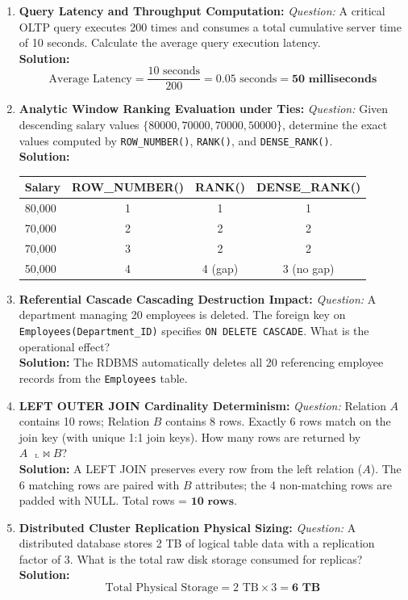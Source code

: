\begin{enumerate}[label=\textbf{Problem \arabic*.},leftmargin=1.5cm]
\item \textbf{Query Latency and Throughput Computation:}
\textit{Question:} A critical OLTP query executes 200 times and consumes a total cumulative server time of 10 seconds. Calculate the average query execution latency. \\
\textbf{Solution:}
\[
\text{Average Latency} = \frac{10\text{ seconds}}{200} = 0.05\text{ seconds} = \mathbf{50\text{ milliseconds}}
\]

\item \textbf{Analytic Window Ranking Evaluation under Ties:}
\textit{Question:} Given descending salary values $\{80000, 70000, 70000, 50000\}$, determine the exact values computed by \texttt{ROW\_NUMBER()}, \texttt{RANK()}, and \texttt{DENSE\_RANK()}. \\
\textbf{Solution:}
\begin{center}
\begin{tabular}{l c c c}
\toprule
\textbf{Salary} & \textbf{ROW\_NUMBER()} & \textbf{RANK()} & \textbf{DENSE\_RANK()} \\
\midrule
80,000 & 1 & 1 & 1 \\
70,000 & 2 & 2 & 2 \\
70,000 & 3 & 2 & 2 \\
50,000 & 4 & 4 (gap) & 3 (no gap) \\
\bottomrule
\end{tabular}
\end{center}

\item \textbf{Referential Cascade Cascading Destruction Impact:}
\textit{Question:} A department managing 20 employees is deleted. The foreign key on \texttt{Employees(Department\_ID)} specifies \texttt{ON DELETE CASCADE}. What is the operational effect? \\
\textbf{Solution:} The RDBMS automatically deletes all 20 referencing employee records from the \texttt{Employees} table.

\item \textbf{LEFT OUTER JOIN Cardinality Determinism:}
\textit{Question:} Relation $A$ contains 10 rows; Relation $B$ contains 8 rows. Exactly 6 rows match on the join key (with unique 1:1 join keys). How many rows are returned by $A \text{ } {}_{{}^{\text{L}}}\!\bowtie B$? \\
\textbf{Solution:} A LEFT JOIN preserves every row from the left relation ($A$). The 6 matching rows are paired with $B$ attributes; the 4 non-matching rows are padded with NULL. Total rows = $\mathbf{10\text{ rows}}$.

\item \textbf{Distributed Cluster Replication Physical Sizing:}
\textit{Question:} A distributed database stores 2 TB of logical table data with a replication factor of 3. What is the total raw disk storage consumed for replicas? \\
\textbf{Solution:}
\[
\text{Total Physical Storage} = 2\text{ TB} \times 3 = \mathbf{6\text{ TB}}
\]
\end{enumerate}


